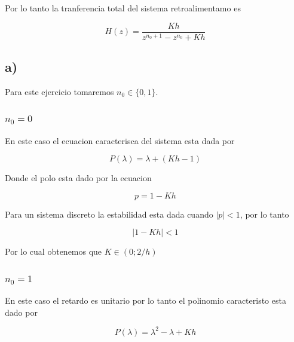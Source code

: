 \documentclass{article}
\begin{document}
            Por lo tanto la tranferencia total del sistema retroalimentamo es 

            \begin{equation}
                H(z) = \frac{Kh}{z^{n_0+1} - z^{n_0} + Kh }
            \end{equation}

            \subsection{a)}

                Para este ejercicio tomaremos $n_0 \in \{0,1\}$.

                \subsubsection{$n_0=0$}

                    En este caso el ecuacion caracterisca del sistema esta dada por 

                    \begin{equation}
                        P(\lambda) = \lambda + ( Kh -1 )
                    \end{equation}

                    Donde el polo esta dado por la ecuacion 

                    \begin{equation}
                        p = 1 - Kh
                    \end{equation}

                    Para un sistema discreto la estabilidad esta dada cuando $|p|<1$, por lo tanto 

                    \begin{equation}
                        |1 - Kh| < 1
                    \end{equation}

                    Por lo cual obtenemos que $K \in ( 0 ; 2/h )$

                \subsubsection{$n_0=1$}

                    En este caso el retardo es unitario por lo tanto el polinomio caracteristo esta dado por 

                    \begin{equation}
                        P(\lambda) = \lambda^2 - \lambda + Kh
                    \end{equation}
\end{document}
